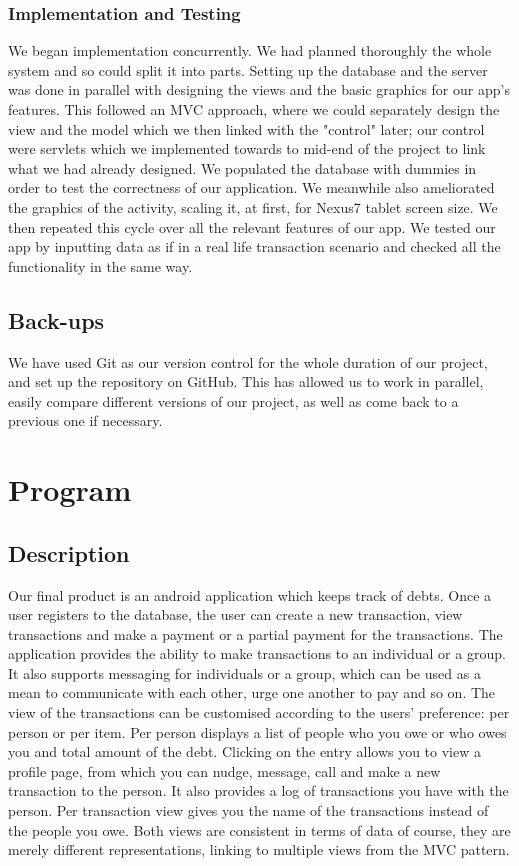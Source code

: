 \documentclass[a4paper,11pt]{article}
\begin{document}
\subsubsection*{Implementation and Testing}
We began implementation concurrently. We had planned thoroughly the whole system and so could split it into parts. Setting up the database and the server was done in parallel with designing the views and the basic graphics for our app's features. This followed an MVC approach, where we could separately design the view and the model which we then linked with the "control" later; our control were servlets which we implemented towards to mid-end of the project to link what we had already designed. We populated the database with dummies in order to test the correctness of our application. We meanwhile also ameliorated the graphics of the activity, scaling it, at first, for Nexus7 tablet screen size. We then repeated this cycle over all the relevant features of our app. We tested our app by inputting data as if in a real life transaction scenario and checked all the functionality in the same way.


\subsection*{Back-ups}
We have used Git as our version control for the whole duration of our project, and set up the repository on GitHub. This has allowed us to work in parallel, easily compare different versions of our project, as well as come back to a previous one if necessary. 


\section*{Program }
\subsection*{Description}
Our final product is an android application which keeps track of debts. Once a user registers to the database, the user can create a new transaction, view transactions and make a payment or a partial payment for the transactions. The application provides the ability to make transactions to an individual or a group. It also supports messaging for individuals or a group, which can be used as a mean to communicate with each other, urge one another to pay and so on. The view of the transactions can be customised according to the users’ preference: per person or per item. Per person displays a list of people who you owe or who owes you and total amount of the debt. Clicking on the entry allows you to view a profile page, from which you can nudge, message, call and make a new transaction to the person. It also provides a log of transactions you have with the person. Per transaction view gives you the name of the transactions instead of the people you owe. Both views are consistent in terms of data of course, they are merely different representations, linking to multiple views from the MVC pattern.
\end{document}
